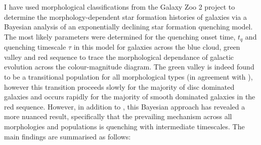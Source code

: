 I have used morphological classifications from the Galaxy Zoo 2 project to determine the morphology-dependent star formation histories of galaxies via a Bayesian analysis of an exponentially declining star formation quenching model. The most likely parameters were determined for the quenching onset time, $t_q$ and quenching timescale $\tau$ in this model for galaxies across the blue cloud, green valley and red sequence to trace the morphological dependance of galactic evolution across the colour-magnitude diagram. The green valley is indeed found to be a transitional population for all morphological types (in agreement with \citet{schawinski14}), however this transition proceeds slowly for the majority of disc dominated galaxies and occurs rapidly for the majority of smooth dominated galaxies in the red sequence. However, in addition to \citet{schawinski14}, this Bayesian approach has revealed a more nuanced result, specifically that the prevailing mechanism across all morphologies and populations is quenching with intermediate timescales. The main findings are summarised as follows:

